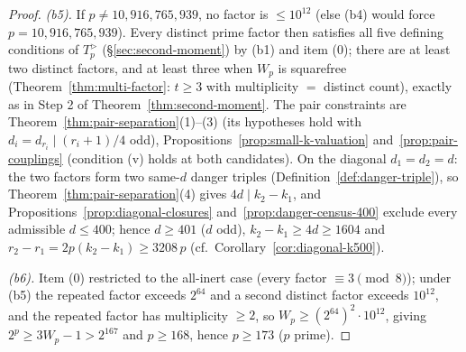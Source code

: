 \documentclass[11pt]{amsart}
\theoremstyle{plain}
\theoremstyle{definition}
\theoremstyle{remark}
\numberwithin{equation}{section}
\begin{document}
\begin{proof}
\emph{(b5).} If $p \neq 10{,}916{,}765{,}939$, no factor is
$\leq 10^{12}$ (else (b4) would force $p = 10{,}916{,}765{,}939$). Every
distinct prime factor then satisfies all five defining conditions of
$T_p^{>}$ (\S\ref{sec:second-moment}) by (b1) and item (0); there are at
least two distinct factors, and at least three when $W_p$ is squarefree
(Theorem~\ref{thm:multi-factor}: $t \geq 3$ with multiplicity $=$
distinct count), exactly as in Step 2 of
Theorem~\ref{thm:second-moment}. The pair constraints are
Theorem~\ref{thm:pair-separation}(1)--(3) (its hypotheses hold with
$d_i = d_{r_i} \mid (r_i + 1)/4$ odd),
Propositions~\ref{prop:small-k-valuation}
and~\ref{prop:pair-couplings} (condition (v) holds at both candidates).
On the diagonal $d_1 = d_2 = d$: the two factors form two same-$d$
danger triples (Definition~\ref{def:danger-triple}), so
Theorem~\ref{thm:pair-separation}(4) gives $4 d \mid k_2 - k_1$, and
Propositions~\ref{prop:diagonal-closures} and~\ref{prop:danger-census-400}
exclude every admissible
$d \leq 400$; hence $d \geq 401$ ($d$ odd), $k_2 - k_1 \geq 4 d \geq
1604$ and $r_2 - r_1 = 2p(k_2 - k_1) \geq 3208\,p$ (cf.\
Corollary~\ref{cor:diagonal-k500}).

\emph{(b6).} Item (0) restricted to the all-inert case (every factor
$\equiv 3 \pmod 8$); under (b5) the repeated factor exceeds $2^{64}$ and
a second distinct factor exceeds $10^{12}$, and the repeated factor has
multiplicity $\geq 2$, so $W_p \geq (2^{64})^2 \cdot 10^{12}$, giving
$2^p \geq 3 W_p - 1 > 2^{167}$ and $p \geq 168$, hence $p \geq 173$ ($p$
prime).
\end{proof}
\end{document}
